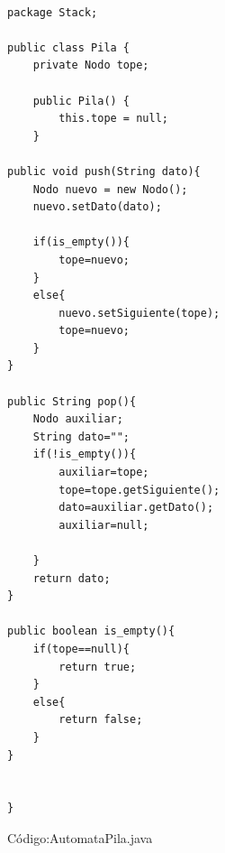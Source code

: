 \lstset{language=Java, breaklines=true, basicstyle=\footnotesize}
\begin{lstlisting}[frame=single]
	
package Stack;

public class Pila {
    private Nodo tope;

    public Pila() {
        this.tope = null;
    }
    
public void push(String dato){
    Nodo nuevo = new Nodo();
    nuevo.setDato(dato);
    
    if(is_empty()){
        tope=nuevo;
    }
    else{
        nuevo.setSiguiente(tope);
        tope=nuevo;
    }
}
 
public String pop(){
    Nodo auxiliar;
    String dato="";
    if(!is_empty()){
        auxiliar=tope;
        tope=tope.getSiguiente();
        dato=auxiliar.getDato();
        auxiliar=null;
        
    }
    return dato;
}  

public boolean is_empty(){
    if(tope==null){
        return true;
    }
    else{
        return false;
    }
}

    
}

\end{lstlisting}
\vspace{1.5cm}
C\'odigo:AutomataPila.java

